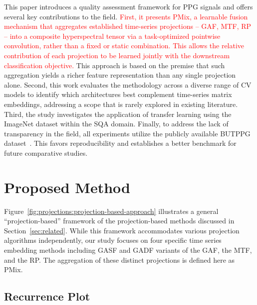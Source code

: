 \documentclass[final,3p,times,twocolumn]{elsarticle}
\newcommand{\red}[1]{\textcolor{red}{#1}}
\begin{document}
This paper introduces a quality assessment framework for \gls{PPG} signals and offers several key contributions to the field.
\red{First, it presents \gls{PMix}, a learnable fusion mechanism that aggregates established time-series projections -- \gls{GAF}, \gls{MTF}, \gls{RP} -- into a composite hyperspectral tensor via a task-optimized pointwise convolution, rather than a fixed or static combination. This allows the relative contribution of each projection to be learned jointly with the downstream classification objective.}
This approach is based on the premise that such aggregation yields a richer feature representation than any single projection alone.
Second, this work evaluates the methodology across a diverse range of \gls{CV} models to identify which architectures best complement time-series matrix embeddings, addressing a scope that is rarely explored in existing literature.
Third, the study investigates the application of transfer learning using the ImageNet dataset within the \gls{SQA} domain.
Finally, to address the lack of transparency in the field, all experiments utilize the publicly available \gls{BUTPPG} dataset~\cite{butppg}.
This favors reproducibility and establishes a better benchmark for future comparative studies.



\section{Proposed Method}
\label{sec_proposed_method}

Figure~\ref{fig:projections:projection-based-approach} illustrates a general ``projection-based'' framework of the projection-based methods discussed in Section~\ref{sec:related}.
While this framework accommodates various projection algorithms independently, our study focuses on four specific time series embedding methods including \gls{GASF} and \gls{GADF} variants of the \gls{GAF}, the \gls{MTF}, and the \gls{RP}.
The aggregation of these distinct projections is defined here as \gls{PMix}.






\subsection{Recurrence Plot}
\end{document}
